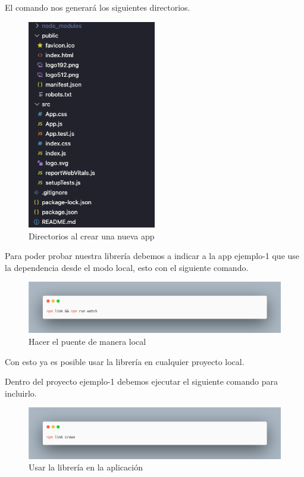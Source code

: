 El comando nos generará los siguientes directorios.
\newline
\begin{figure}[H]
    \includegraphics[width=0.5\textwidth]{./Imagenes/9.3}
   \centering 
    \caption[Directorios al crear una nueva app]{Directorios al crear una nueva app}
    \end{figure}
\newline

Para poder probar nuestra librería debemos a indicar a la app ejemplo-1 que use la dependencia desde el modo local, esto con el siguiente comando.\newline
\begin{figure}[H]
    \includegraphics[width=1\textwidth]{./Imagenes/9.4.png}
   \centering 
    \caption[Hacer el puente de manera local]{Hacer el puente de manera local}
    \end{figure}
\newline
Con esto ya es posible usar la librería en cualquier proyecto local.

Dentro del proyecto ejemplo-1 debemos ejecutar el siguiente comando para incluirlo.
\begin{figure}[H]
    \includegraphics[width=1\textwidth]{./Imagenes/9.5.png}
   \centering 
    \caption[Usar la librería en la aplicación]{Usar la librería en la aplicación}
    \end{figure}
\newline

